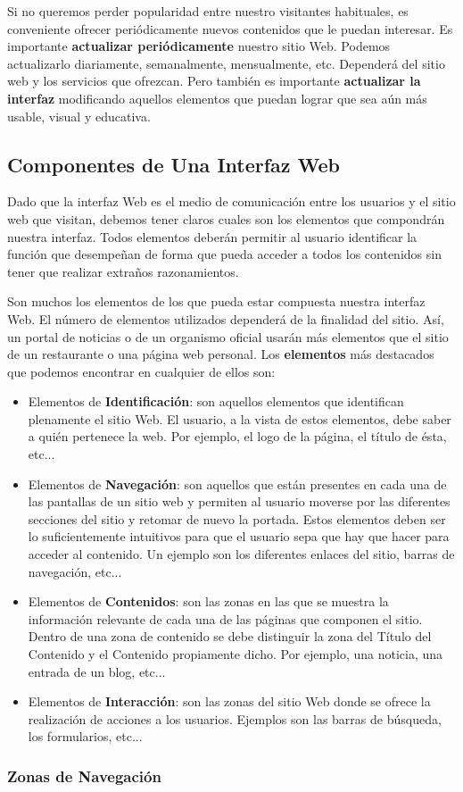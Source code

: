 Si no queremos perder popularidad entre nuestro visitantes habituales, es conveniente ofrecer periódicamente nuevos contenidos que le puedan interesar. Es importante \textbf{actualizar periódicamente} nuestro sitio Web. Podemos actualizarlo diariamente, semanalmente, mensualmente, etc. Dependerá del sitio web y los servicios que ofrezcan. Pero también es importante \textbf{actualizar la interfaz} modificando aquellos elementos que puedan lograr que sea aún más usable, visual y educativa.

\subsection{Componentes de Una Interfaz Web}
Dado que la interfaz Web es el medio de comunicación entre los usuarios y el sitio web que visitan, debemos tener claros cuales son los elementos que compondrán nuestra interfaz. Todos elementos deberán permitir al usuario identificar la función que desempeñan de forma que pueda acceder a todos los contenidos sin tener que realizar extraños razonamientos.

Son muchos los elementos de los que pueda estar compuesta nuestra interfaz Web. El número de elementos utilizados dependerá de la finalidad del sitio. Así, un portal de noticias o de un organismo oficial usarán más elementos que el sitio de un restaurante o una página web personal. Los \textbf{elementos} más destacados que podemos encontrar en cualquier de ellos son:

\begin{itemize}
    \item Elementos de \textbf{Identificación}: son aquellos elementos que identifican plenamente el sitio Web. El usuario, a la vista de estos elementos, debe saber a quién pertenece la web. Por ejemplo, el logo de la página, el título de ésta, etc...
    \item Elementos de \textbf{Navegación}: son aquellos que están presentes en cada una de las pantallas de un sitio web y permiten al usuario moverse por las diferentes secciones del sitio y retomar de nuevo la portada. Estos elementos deben ser lo suficientemente intuitivos para que el usuario sepa que hay que hacer para acceder al contenido. Un ejemplo son los diferentes enlaces del sitio, barras de navegación, etc...
    \item Elementos de \textbf{Contenidos}: son las zonas en las que se muestra la información relevante de cada una de las páginas que componen el sitio. Dentro de una zona de contenido se debe distinguir la zona del Título del Contenido y el Contenido propiamente dicho. Por ejemplo, una noticia, una entrada de un blog, etc...
    \item Elementos de \textbf{Interacción}: son las zonas del sitio Web donde se ofrece la realización de acciones a los usuarios. Ejemplos son las barras de búsqueda, los formularios, etc...
\end{itemize}

\subsubsection{Zonas de Navegación}










